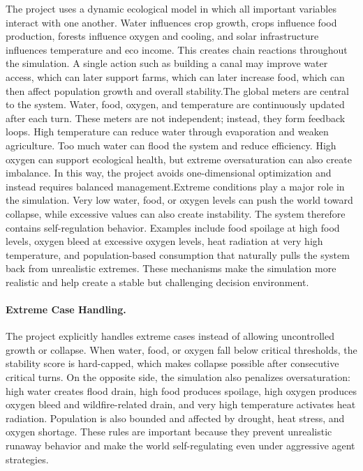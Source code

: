 \documentclass[12pt,a4paper]{article}
\begin{document}
The project uses a dynamic ecological model in which all important variables interact with one another. Water influences crop growth, crops influence food production, forests influence oxygen and cooling, and solar infrastructure influences temperature and eco income. This creates chain reactions throughout the simulation. A single action such as building a canal may improve water access, which can later support farms, which can later increase food, which can then affect population growth and overall stability.The global meters are central to the system. Water, food, oxygen, and temperature are continuously updated after each turn. These meters are not independent; instead, they form feedback loops. High temperature can reduce water through evaporation and weaken agriculture. Too much water can flood the system and reduce efficiency. High oxygen can support ecological health, but extreme oversaturation can also create imbalance. In this way, the project avoids one-dimensional optimization and instead requires balanced management.Extreme conditions play a major role in the simulation. Very low water, food, or oxygen levels can push the world toward collapse, while excessive values can also create instability. The system therefore contains self-regulation behavior. Examples include food spoilage at high food levels, oxygen bleed at excessive oxygen levels, heat radiation at very high temperature, and population-based consumption that naturally pulls the system back from unrealistic extremes. These mechanisms make the simulation more realistic and help create a stable but challenging decision environment.

\paragraph{Extreme Case Handling.}
The project explicitly handles extreme cases instead of allowing uncontrolled growth or collapse. When water, food, or oxygen fall below critical thresholds, the stability score is hard-capped, which makes collapse possible after consecutive critical turns. On the opposite side, the simulation also penalizes oversaturation: high water creates flood drain, high food produces spoilage, high oxygen produces oxygen bleed and wildfire-related drain, and very high temperature activates heat radiation. Population is also bounded and affected by drought, heat stress, and oxygen shortage. These rules are important because they prevent unrealistic runaway behavior and make the world self-regulating even under aggressive agent strategies.
\end{document}

